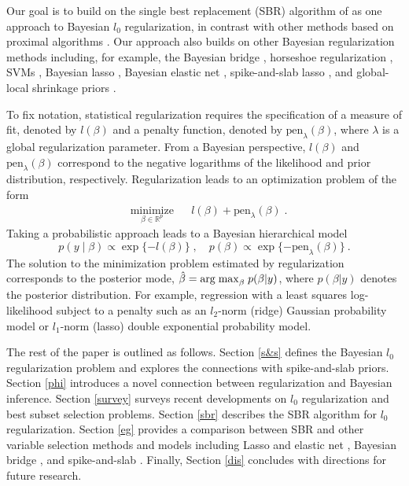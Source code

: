 \documentclass[11pt]{article}%
\numberwithin{equation}{section}
\theoremstyle{plain}
\begin{document}
Our goal is to build on the single best replacement (SBR) algorithm of \cite{soussen2011} as one approach to Bayesian $l_0$ regularization, in contrast with other methods based on proximal algorithms \citep{parikh2014proximal,polson2015proximal,polson2017proximal}. Our approach also builds on other Bayesian regularization methods including, for example, the Bayesian bridge \citep{polson2014}, horseshoe regularization \citep{carvalho2010,bhadra2016}, SVMs \citep{polson2011}, Bayesian lasso \citep{hans2009,park2008,carlin1991}, Bayesian elastic net \citep{li2010bayesian,hans2011}, spike-and-slab lasso \citep{rockova2016}, and global-local shrinkage priors \citep{bhadra2016,griffin2010}.

To fix notation, statistical regularization requires the specification of a measure of fit, denoted by $l\left(\beta\right)$ and a penalty function, denoted by $\text{pen}_\lambda\left(\beta\right)$, where $\lambda$ is a global regularization parameter.  From a Bayesian perspective,  $l\left(\beta\right)$ and $\text{pen}_\lambda\left(\beta\right)$ correspond to the negative logarithms of the likelihood and prior distribution, respectively.  Regularization leads to an optimization problem of the form 
\begin{equation}
\label{eqn:reg}
\begin{aligned}
& \underset{\beta \in \mathbb{R}^p}{\text{minimize}}
& & l\left(\beta\right) + \text{pen}_\lambda\left(\beta\right) \; . 
\end{aligned}
\end{equation}
Taking a probabilistic approach leads to a Bayesian hierarchical model
$$
p(y \mid \beta) \propto \exp\{-l(\beta)\} \; , \quad p(\beta) \propto \exp\{ -\text{pen}_\lambda\left(\beta\right) \} \ .
$$
The solution to the minimization problem estimated by regularization corresponds to the posterior mode, 
$ \hat{\beta} = {\rm arg \; max}_\beta \; p( \beta|y) $, where $ p(\beta|y)$ denotes the posterior distribution. 
For example, regression with a least squares log-likelihood 
subject to a penalty such as an $l_2$-norm (ridge) Gaussian probability model or $l_1$-norm (lasso) double exponential probability model.

The rest of the paper is outlined as follows.  Section \ref{s&s} defines the Bayesian $l_0$ regularization problem and explores the connections with spike-and-slab priors.  Section \ref{phi} introduces a novel connection between regularization and Bayesian inference.  Section \ref{survey} surveys recent developments on $l_0$ regularization and best subset selection problems.  Section \ref{sbr} describes the SBR algorithm for $l_0$ regularization.  Section \ref{eg} provides a comparison between SBR and other variable selection methods and models including Lasso and elastic net \citep{tibshirani1996,zou2005}, Bayesian bridge \citep{polson2014}, and spike-and-slab \citep{george1993}.  Finally, Section \ref{dis} concludes with directions for future research.
\end{document}
